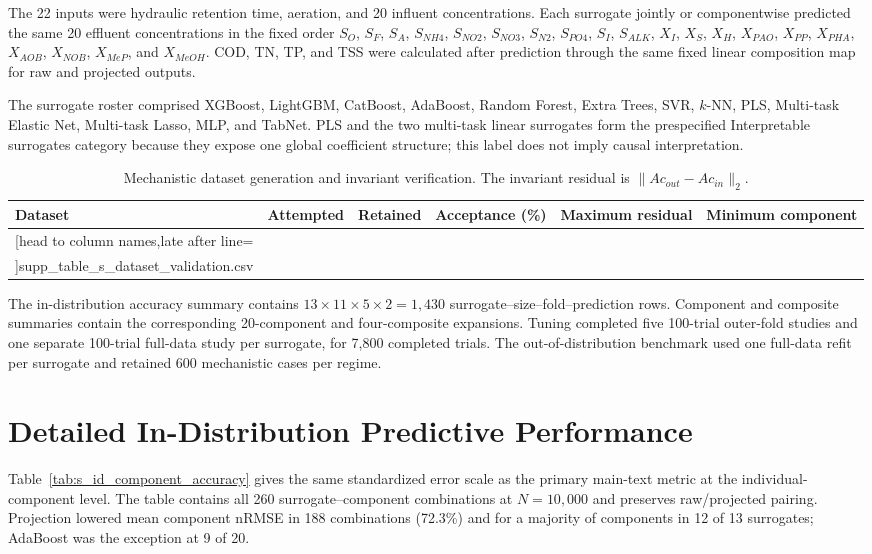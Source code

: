 \documentclass[a4paper,10pt]{article}
\newcommand{\csvrowssix}[1]{%
  \csvreader[head to column names,late after line=\\]{#1}{}{\colA & \colB & \colC & \colD & \colE & \colF}}
\begin{document}
The 22 inputs were hydraulic retention time, aeration, and 20 influent concentrations. Each surrogate jointly or componentwise predicted the same 20 effluent concentrations in the fixed order $S_O$, $S_F$, $S_A$, $S_{NH4}$, $S_{NO2}$, $S_{NO3}$, $S_{N2}$, $S_{PO4}$, $S_I$, $S_{ALK}$, $X_I$, $X_S$, $X_H$, $X_{PAO}$, $X_{PP}$, $X_{PHA}$, $X_{AOB}$, $X_{NOB}$, $X_{MeP}$, and $X_{MeOH}$. COD, TN, TP, and TSS were calculated after prediction through the same fixed linear composition map for raw and projected outputs.

The surrogate roster comprised XGBoost, LightGBM, CatBoost, AdaBoost, Random Forest, Extra Trees, SVR, $k$-NN, PLS, Multi-task Elastic Net, Multi-task Lasso, MLP, and TabNet. PLS and the two multi-task linear surrogates form the prespecified Interpretable surrogates category because they expose one global coefficient structure; this label does not imply causal interpretation.

\begin{table}[htbp]
\centering
\caption{Mechanistic dataset generation and invariant verification. The invariant residual is $\|Ac_{out}-Ac_{in}\|_2$.}
\label{tab:s_dataset_validation}
\small
\begin{tabular}{lrrrrr}
\toprule
Dataset & Attempted & Retained & Acceptance (\%) & Maximum residual & Minimum component \\
\midrule
\csvrowssix{supp_table_s_dataset_validation.csv}
\bottomrule
\end{tabular}
\end{table}

The in-distribution accuracy summary contains $13\times11\times5\times2=1{,}430$ surrogate--size--fold--prediction rows. Component and composite summaries contain the corresponding 20-component and four-composite expansions. Tuning completed five 100-trial outer-fold studies and one separate 100-trial full-data study per surrogate, for 7,800 completed trials. The out-of-distribution benchmark used one full-data refit per surrogate and retained 600 mechanistic cases per regime.

\section{Detailed In-Distribution Predictive Performance}

Table~\ref{tab:s_id_component_accuracy} gives the same standardized error scale as the primary main-text metric at the individual-component level. The table contains all 260 surrogate--component combinations at $N=10{,}000$ and preserves raw/projected pairing. Projection lowered mean component nRMSE in 188 combinations (72.3\%) and for a majority of components in 12 of 13 surrogates; AdaBoost was the exception at 9 of 20.
\end{document}
